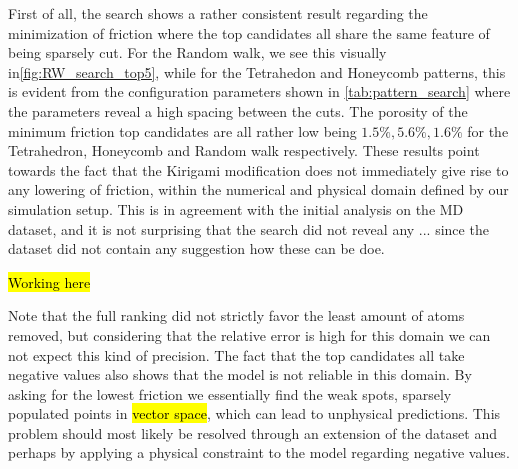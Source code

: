 First of all, the search shows a rather consistent result regarding the minimization of friction where the top candidates all share the same feature of being sparsely cut. For the Random walk, we see this visually in\cref{fig:RW_search_top5}, while for the Tetrahedon and Honeycomb patterns, this is evident from the configuration parameters shown in
\cref{tab:pattern_search} where the parameters reveal a high spacing between the
cuts. The porosity of the minimum friction top candidates are all rather low being $1.5\%, 5.6\%, 1.6\%$ for the Tetrahedron, Honeycomb and Random walk respectively. These results point towards the fact that the Kirigami modification does not immediately give rise to any lowering of friction, within the numerical and physical domain defined by our simulation setup. This is in agreement with the initial analysis on the \acrshort{MD} dataset, and it is not surprising that the search did not reveal any ... since the dataset did not contain any suggestion how these can be doe.

%
%
\hl{Working here}
%
%



Note that the full ranking did not strictly favor the least amount of
atoms removed, but considering that the relative error is high for this domain we can not expect this kind of precision. The fact that the top candidates all take
negative values also shows that the model is not reliable in this domain. By
asking for the lowest friction we essentially find the weak spots, sparsely populated points in \hl{vector space},  which can lead to unphysical predictions. This problem should most likely be resolved through an extension of the dataset and perhaps by applying a physical constraint to the
model regarding negative values. 

